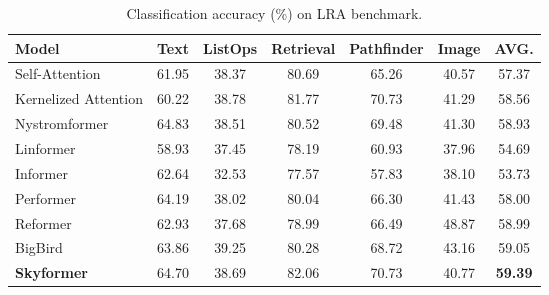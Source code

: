 

\begin{table}
\caption{Classification accuracy (\%) on LRA benchmark.}
\label{table:lra_acc}
\centering
\begin{tabular}{lcccccc}
\toprule

Model & Text    & ListOps & Retrieval & Pathfinder &  Image &	AVG.  \\
\midrule
Self-Attention & 61.95& 	38.37& 	80.69& 	65.26& 	40.57 & 57.37\\
Kernelized Attention & 60.22 & 	38.78 & 	81.77 & 	70.73 & 41.29 & 58.56	\\
\cmidrule(r){2-6}
Nystromformer & 64.83 & 	38.51&	80.52 & 	69.48 & 41.30 & 58.93	 \\
Linformer  & 58.93 & 	37.45 &	78.19 & 	60.93 & 37.96 & 54.69	 \\
Informer& 62.64 & 	32.53&	77.57 & 	57.83 &  38.10 & 53.73	 \\
Performer  & 64.19 & 	38.02 &	80.04 & 	66.30 & 41.43 & 58.00	 \\
Reformer  & 62.93& 	37.68& 	78.99&	66.49& 	48.87 & 58.99\\
BigBird & 63.86 &	39.25&	80.28 &	68.72 & 43.16 & 59.05\\
\cmidrule(r){2-6}
\textbf{Skyformer}   & 64.70 & 	38.69&	82.06 & 	70.73 & 40.77 & \textbf{59.39}	 \\
\bottomrule
\end{tabular}
\end{table}


